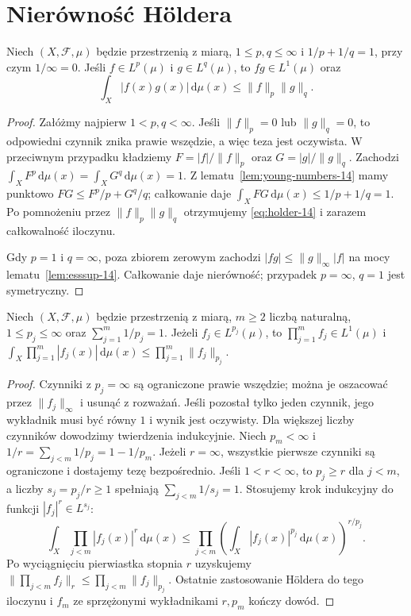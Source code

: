 \section{Nierówność Höldera}
\begin{twierdzenie}[Hölder]
\label{thm:holder-14}
Niech $(X,\mathcal F,\mu)$ będzie przestrzenią z miarą,
$1\le p,q\le\infty$ i $1/p+1/q=1$, przy czym $1/\infty=0$.
Jeśli $f\in L^p(\mu)$ i $g\in L^q(\mu)$,
to $fg\in L^1(\mu)$ oraz
\begin{equation}\label{eq:holder-14}
\int_X|f(x)g(x)|\,\mathrm d\mu(x)
\le\|f\|_p\|g\|_q.
\end{equation}
\end{twierdzenie}
\begin{proof}
Załóżmy najpierw $1<p,q<\infty$.
Jeśli $\|f\|_p=0$ lub $\|g\|_q=0$,
to odpowiedni czynnik znika prawie wszędzie,
a więc teza jest oczywista. W przeciwnym przypadku
kładziemy $F=|f|/\|f\|_p$ oraz $G=|g|/\|g\|_q$.
Zachodzi $\int_XF^p\,\mathrm d\mu(x)=
\int_XG^q\,\mathrm d\mu(x)=1$.
Z lematu~\ref{lem:young-numbers-14} mamy punktowo
$FG\le F^p/p+G^q/q$; całkowanie daje
$\int_XFG\,\mathrm d\mu(x)\le1/p+1/q=1$.
Po pomnożeniu przez $\|f\|_p\|g\|_q$ otrzymujemy
\eqref{eq:holder-14} i zarazem całkowalność iloczynu.

Gdy $p=1$ i $q=\infty$, poza zbiorem zerowym zachodzi
$|fg|\le\|g\|_\infty|f|$ na mocy
lematu~\ref{lem:esssup-14}. Całkowanie daje nierówność;
przypadek $p=\infty$, $q=1$ jest symetryczny.
\end{proof}

\begin{wniosek}
\label{cor:generalized-holder-14}
Niech $(X,\mathcal F,\mu)$ będzie przestrzenią z miarą,
$m\ge2$ liczbą naturalną, $1\le p_j\le\infty$ oraz
$\sum_{j=1}^m1/p_j=1$. Jeżeli $f_j\in L^{p_j}(\mu)$,
to $\prod_{j=1}^m f_j\in L^1(\mu)$ i
$\int_X\prod_{j=1}^m|f_j(x)|\,\mathrm d\mu(x)
\le\prod_{j=1}^m\|f_j\|_{p_j}$.
\end{wniosek}
\begin{proof}
Czynniki z $p_j=\infty$ są ograniczone prawie wszędzie;
można je oszacować przez $\|f_j\|_\infty$ i usunąć
z rozważań. Jeśli pozostał tylko jeden czynnik,
jego wykładnik musi być równy $1$ i wynik jest oczywisty.
Dla większej liczby czynników dowodzimy twierdzenia indukcyjnie.
Niech $p_m<\infty$ i $1/r=\sum_{j<m}1/p_j=1-1/p_m$.
Jeżeli $r=\infty$, wszystkie pierwsze czynniki
są ograniczone i dostajemy tezę bezpośrednio.
Jeśli $1<r<\infty$, to $p_j\ge r$ dla $j<m$,
a liczby $s_j=p_j/r\ge1$ spełniają
$\sum_{j<m}1/s_j=1$. Stosujemy krok indukcyjny
do funkcji $|f_j|^r\in L^{s_j}$:
\[
\int_X\prod_{j<m}|f_j(x)|^r\,\mathrm d\mu(x)
\le\prod_{j<m}\left(\int_X|f_j(x)|^{p_j}\,
\mathrm d\mu(x)\right)^{r/p_j}.
\]
Po wyciągnięciu pierwiastka stopnia $r$ uzyskujemy
$\|\prod_{j<m}f_j\|_r\le\prod_{j<m}\|f_j\|_{p_j}$.
Ostatnie zastosowanie Höldera do tego iloczynu i $f_m$
ze sprzężonymi wykładnikami $r,p_m$ kończy dowód.
\end{proof}

